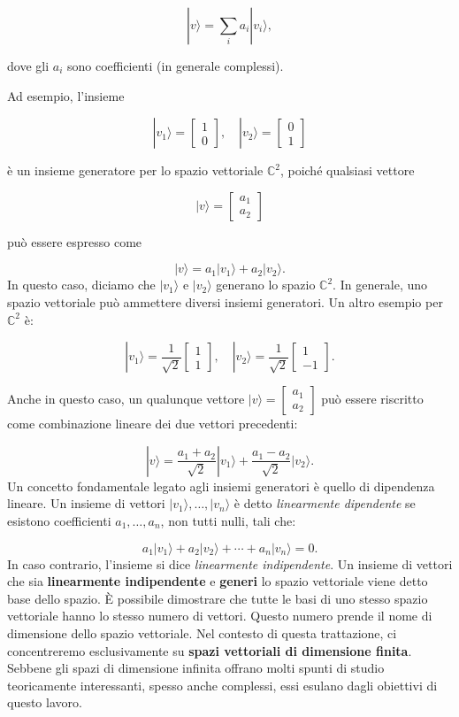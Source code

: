 \documentclass[a4paper,12pt]{report}
\theoremstyle{plain}
\begin{document}
\[|v\rangle = \sum_i a_i |v_i\rangle,\]

\noindent dove gli \(a_i\) sono coefficienti (in generale complessi).

Ad esempio, l'insieme

\[|v_1\rangle = 
\begin{bmatrix}
1 \\
0
\end{bmatrix},
\quad |v_2\rangle = 
\begin{bmatrix}
0 \\
1
\end{bmatrix}\]

è un insieme generatore per lo spazio vettoriale \(\mathbb{C}^2\), poiché qualsiasi vettore

\[|v\rangle = 
\begin{bmatrix}
a_1 \\
a_2
\end{bmatrix}\]

può essere espresso come

\[|v\rangle = a_1 |v_1\rangle + a_2 |v_2\rangle.\]
In questo caso, diciamo che \(|v_1\rangle\) e \(|v_2\rangle\) generano lo spazio \(\mathbb{C}^2\). In generale, uno spazio vettoriale può ammettere diversi insiemi generatori. Un altro esempio per \(\mathbb{C}^2\) è:

\[|v_1\rangle = \frac{1}{\sqrt{2}} 
\begin{bmatrix}
1 \\
1
\end{bmatrix},
\quad |v_2\rangle = \frac{1}{\sqrt{2}} 
\begin{bmatrix}
1 \\
-1
\end{bmatrix}.\]

\noindent Anche in questo caso, un qualunque vettore \(|v\rangle = 
\begin{bmatrix}
a_1 \\
a_2
\end{bmatrix}\) può essere riscritto come combinazione lineare dei due vettori precedenti:

\[|v\rangle = \frac{a_1 + a_2}{\sqrt{2}} |v_1\rangle + \frac{a_1 - a_2}{\sqrt{2}} |v_2\rangle.\]
Un concetto fondamentale legato agli insiemi generatori è quello di dipendenza lineare.
Un insieme di vettori \(|v_1\rangle, \ldots, |v_n\rangle\) è detto \emph{linearmente dipendente} se esistono coefficienti \(a_1, \ldots, a_n\), non tutti nulli, tali che:

\[a_1|v_1\rangle + a_2|v_2\rangle + \cdots + a_n|v_n\rangle = 0.\]
In caso contrario, l'insieme si dice \emph{linearmente indipendente}.
Un insieme di vettori che sia \textbf{linearmente indipendente} e \textbf{generi} lo spazio vettoriale viene detto base dello spazio. È possibile dimostrare che tutte le basi di uno stesso spazio vettoriale hanno lo stesso numero di vettori. Questo numero prende il nome di dimensione dello spazio vettoriale.
Nel contesto di questa trattazione, ci concentreremo esclusivamente su \textbf{spazi vettoriali di dimensione finita}. Sebbene gli spazi di dimensione infinita offrano molti spunti di studio teoricamente interessanti, spesso anche complessi, essi esulano dagli obiettivi di questo lavoro.
\end{document}
